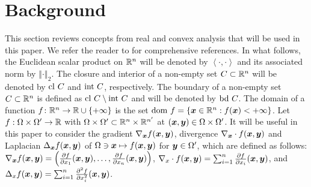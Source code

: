 \section{Background} \label{sec:background}
This section reviews concepts from real and convex analysis that will be used in this paper. We refer the reader to \cite{folland2013real,hiriart2013convexI,hiriart2013convexII,rockafellar1970convex,rockafellar2009variational} for comprehensive references. In what follows, the Euclidean scalar product on $\mathbb{R}^n$ will be denoted by $\left\langle \cdot,\cdot\right\rangle $ and its associated norm by $\left\Vert \cdot\right\Vert _{2}$. The closure and interior of a non-empty set $C\subset\mathbb{R}^n$ will be denoted by $\mathrm{cl~} C$ and $\mathrm{int~} C$, respectively. The boundary of a non-empty set $C\subset\mathbb{R}^n$ is defined as $\mathrm{cl~} C \setminus \mathrm{int~} C$ and will be denoted by $\mathrm{bd~} C$. The domain of a function $f\colon\mathbb{R}^n\to\mathbb{R}\cup\{+\infty\}$ is the set $\mathrm{dom~} f = \left\{ \boldsymbol{x}\in\mathbb{R}^n : f(\boldsymbol{x})<+\infty\right\}$.
%
%
Let $f:\Omega \times \Omega' \to \mathbb{R}$ with $\Omega\times\Omega' \subset \mathbb{R}^n\times\mathbb{R}^{n'}$ at $(\boldsymbol{x},\boldsymbol{y}) \in \Omega\times \Omega'$. It will be useful in this paper to consider the gradient $\nabla_{\boldsymbol{x}}f(\boldsymbol{x},\boldsymbol{y})$, divergence $\nabla_{\boldsymbol{x}} \cdot f(\boldsymbol{x},\boldsymbol{y})$ and Laplacian $\Delta_{\boldsymbol{x}} f(\boldsymbol{x},\boldsymbol{y})$ of $\Omega \ni \boldsymbol{x} \mapsto f(\boldsymbol{x},\boldsymbol{y})$ for $\boldsymbol{y} \in \Omega'$, which are defined as follows: $\nabla_{\boldsymbol{x}} f(\boldsymbol{x},\boldsymbol{y}) = \left(\frac{\partial f}{\partial x_1} (\boldsymbol{x},\boldsymbol{y}), \dots, \frac{\partial f}{\partial x_n} (\boldsymbol{x},\boldsymbol{y})\right)$,
$\nabla_x \cdot f(\boldsymbol{x},\boldsymbol{y}) = \sum_{i=1}^n\frac{\partial f}{\partial x_i}(\boldsymbol{x},\boldsymbol{y})$, and
$\Delta_x f(\boldsymbol{x},\boldsymbol{y}) = \sum_{i=1}^n\frac{\partial^2 f}{\partial x_i^2}(\boldsymbol{x},\boldsymbol{y})$.

